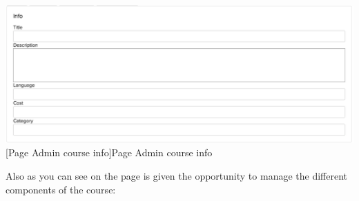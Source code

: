 \begin{minipage}{\linewidth}
    \centering
    \includegraphics[width=1.0\linewidth]{images/chapter4/admin-course-info.png}
    [Page Admin course info]{Page Admin course info}
\end{minipage}

Also as you can see on the page is given the opportunity to manage the different components of the course:
